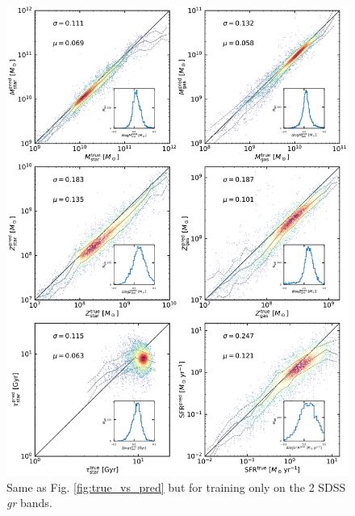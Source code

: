 \documentclass[useAMS,usenatbib]{mnras}
\begin{document}
\begin{figure}
\vspace{-.4cm}
\begin{center}
\includegraphics[height=.5\textheight]{./plots/predicted_vs_true_all_masked_log_gr.pdf}
\end{center}
\vspace{-.5cm}
\caption{Same as Fig. \ref{fig:true_vs_pred} but for training only on the 2 SDSS \textit{gr} bands.}
\label{fig:true_vs_pred3}
\end{figure}
\end{document}
